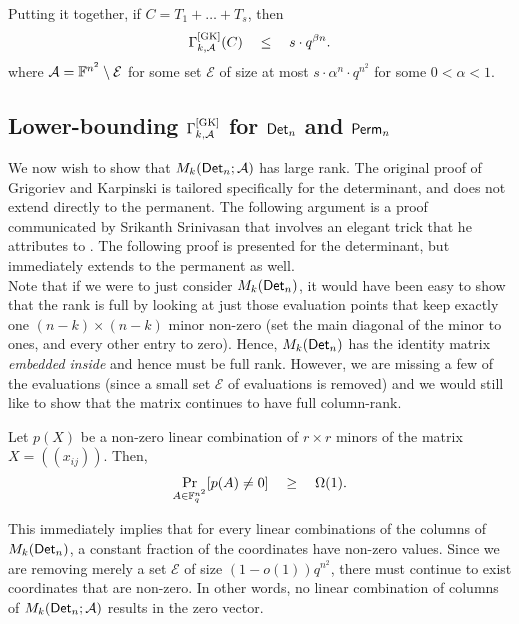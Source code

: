 Putting it together, if $C = T_1 + \dots + T_s$, then 
\begin{equation}\label{eqn:gk-upper-bound-circuit}
\Gamma^{\mathrm{[GK]}}_{k,\mathcal{A}}(C) \quad \leq \quad s \cdot
q^{\beta n}.
\end{equation} 
where $\mathcal{A} = \mathbb{F}^{n^2} \setminus \mathcal{E}$ for some set
$\mathcal{E}$ of size at most $s \cdot \alpha^n \cdot q^{n^2}$ for
some $0< \alpha < 1$.

\subsection{Lower-bounding $\Gamma^{\mathrm{[GK]}}_{k,\mathcal{A}}$ for $\mathsf{Det}_n$ and $\mathsf{Perm}_n$}

We now wish to show that $M_k(\mathsf{Det}_n;\mathcal{A})$ has large rank. The original proof of Grigoriev and Karpinski is tailored specifically for the determinant, and does not extend directly to the permanent. The following argument is a proof communicated by Srikanth Srinivasan \cite{Srikanth13} that involves an elegant trick that he attributes to \cite{Koutis08}. The following proof is presented for the determinant, but immediately extends to the permanent as well. \\


Note that if we were to just consider $M_k(\mathsf{Det}_n)$, it would have been easy to show that the rank is full by looking at just those evaluation points that keep exactly one $(n-k)\times (n-k)$ minor non-zero (set the main diagonal of the minor to ones, and every other entry to zero). Hence, $M_k(\mathsf{Det}_n)$ has the identity matrix \emph{embedded inside} and hence must be full rank. However, we are missing a few of the evaluations (since a small set $\mathcal{E}$ of evaluations is removed) and we would still like to show that the matrix continues to have full column-rank. 

\begin{lemma}\label{lem:random-lc-det-nonzero}
  Let $p(X)$ be a non-zero linear combination of $r\times r$
  minors of the matrix $X = (\!(x_{ij})\!)$. Then, 
  $$
  \Pr_{A\in \mathbb{F}_q^{n^2}}[p(A) \neq 0] \quad \geq \quad \Omega(1).
  $$
\end{lemma}

This immediately implies that for every linear combinations of the columns of $M_k(\mathsf{Det}_n)$, a constant fraction of the coordinates have non-zero values. Since we are removing merely a set $\mathcal{E}$ of size $(1-o(1))q^{n^2}$, there must continue to exist coordinates that are non-zero. In other words, no linear combination of columns of $M_k(\mathsf{Det}_n;\mathcal{A})$ results in the zero vector. 


